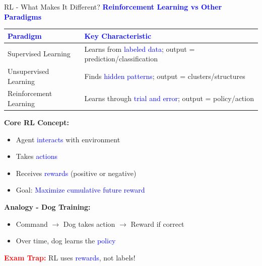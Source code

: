 \documentclass[8pt]{beamer}
\begin{document}
	\begin{frame}{RL - What Makes It Different?}
		\fontsize{6.5}{7.5}\selectfont
		\textcolor{blue}{\textbf{Reinforcement Learning vs Other Paradigms}}
		
		\begin{tabular}{|p{3.5cm}|p{5.5cm}|}
			\hline
			\textcolor{blue}{Paradigm} & \textcolor{blue}{Key Characteristic} \\
			\hline
			Supervised Learning & Learns from \textcolor{blue}{labeled data}; output = prediction/classification \\
			\hline
			Unsupervised Learning & Finds \textcolor{blue}{hidden patterns}; output = clusters/structures \\
			\hline
			Reinforcement Learning & Learns through \textcolor{blue}{trial and error}; output = policy/action \\
			\hline
		\end{tabular}
		
		\textbf{Core RL Concept:}
		\begin{itemize}
			\item Agent \textcolor{blue}{interacts} with environment
			\item Takes \textcolor{blue}{actions}
			\item Receives \textcolor{blue}{rewards} (positive or negative)
			\item Goal: \textcolor{blue}{Maximize cumulative future reward}
		\end{itemize}
		
		\textbf{Analogy - Dog Training:}
		\begin{itemize}
			\item Command $\rightarrow$ Dog takes action $\rightarrow$ Reward if correct
			\item Over time, dog learns the \textcolor{blue}{policy}
		\end{itemize}
		
		\textcolor{red}{\textbf{Exam Trap:}} RL uses \textcolor{blue}{rewards}, not labels!
	\end{frame}
	
\end{document}
